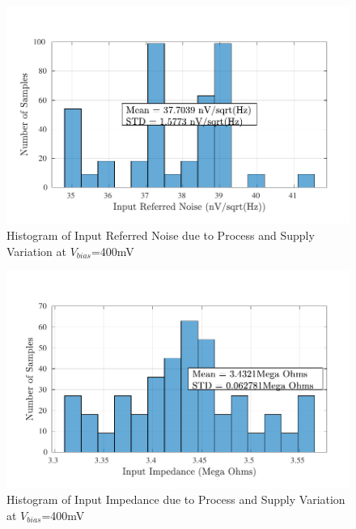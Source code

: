 \begin{figure} [H]
\centering
\includegraphics[scale=1]{Figures/Corners/Overall/PV_Mid/PDFs/PV_Mid_irn.pdf}
\caption{Histogram of Input Referred Noise due to Process and Supply Variation at $V_{bias}$=400mV}
\end{figure}

\begin{figure} [H]
\centering
\includegraphics[scale=1]{Figures/Corners/Overall/PV_Mid/PDFs/PV_Mid_zin.pdf}
\caption{Histogram of Input Impedance due to Process and Supply Variation at $V_{bias}$=400mV}
\end{figure}


